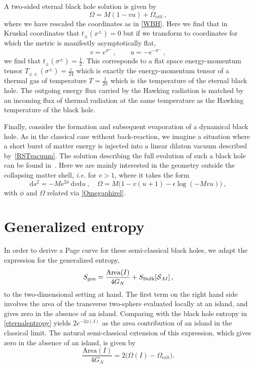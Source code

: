 \documentclass[12pt,a4paper]{article}
\newcommand{\dd}{\mathrm{d}}
\newcommand{\e}{\mathrm{e}}
\newcommand{\be}{\begin{equation}}
\newcommand{\ee}{\end{equation}}
\newcommand{\f}[2]{\frac{#1}{#2}}
\begin{document}
A two-sided eternal black hole solution is given by 
\be\label{Omegaeternal}
    \Omega = M(1-vu)
    + \Omega_\text{crit}
    \, ,
\ee
where we have rescaled the coordinates as in \eqref{WBH}. Here we find that in Kruskal coordinates that $t_\pm(x^\pm)=0$ but if we transform to coordinates for which the metric is manifestly asymptotically flat, 
\be\label{flatcoord}
v=e^{\sigma^+}\>,\qquad u=-e^{-\sigma^-}\>,
\ee
we find that $t_\pm(\sigma^\pm) = \f{1}{2}$. This corresponds to a flat space energy-momentum tensor $T_{\pm\pm}(\sigma^\pm) = \f{c}{24}$ which is exactly the energy-momentum tensor of a thermal gas of temperature $T=\f{1}{2\pi}$ which is the temperature of the eternal black hole. The outgoing energy flux carried by the Hawking radiation is matched by an incoming flux of thermal radiation at the same temperature as the Hawking temperature of the black hole.

Finally, consider the formation and subsequent evaporation of a dynamical black hole. As in the classical case without back-reaction, we imagine a situation where a short burst of matter energy is injected into a linear dilaton vacuum described by~\eqref{RSTvacuum}. The solution describing the full evolution of such a black hole can be found in~\cite{Russo:1992ax}. Here we are mainly interested in the geometry outside the collapsing matter shell, {\it i.e.} for $v>1$, where it takes the form
\be\label{dynamicalRST}
\dd s^2 = - M\e^{2\phi} \, \dd v \dd u~,\quad \Omega = M\big(1-v(u+1) - \epsilon \log(-Mvu)\big)~,
\ee
with $\phi$ and $\Omega$ related via \eqref{Omegaphirel}.

\section{Generalized entropy}\label{Sgen}

In order to derive a Page curve for these semi-classical black holes, we adapt the expression for the generalized entropy, 
\be\label{Sgendef2}
S_\text{gen} = \f{\text{Area}(I)}{4G_N} + S_\text{Bulk}[{\cal S}_{AI}] \,,
\ee
to the two-dimensional setting at hand. 
The first term on the right hand side involves the area of the transverse two-sphere evaluated locally at an island, and gives zero in the absence of an island. Comparing with the black hole entropy in \eqref{eternalentropy} yields $2e^{-2\phi(I)}$ as the area contribution of an island in the classical limit. The natural semi-classical extension of this expression, which gives zero in the absence of an island, is given by \be
\f{\text{Area}(I)}{4G_N} =2\big(\Omega(I)-\Omega_\text{crit}\big).
\ee
\end{document}
